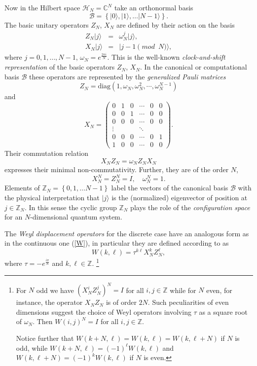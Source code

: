 \documentclass[10pt]{amsart}
\theoremstyle{plain}
\theoremstyle{definition}
\theoremstyle{remark}%
\newcommand{\Z}{\mathbb{Z}}
\newcommand{\ket}[1]{\vert\mathit{#1}\rangle}
\begin{document}
Now in the Hilbert space $\mathcal{H}_{N}=\mathbb{C}^N$ take
an orthonormal basis $$\mathcal{B} = \left\lbrace\ket{0}, \ket{1},
\ldots \ket{N-1}\right\rbrace.$$ The basic unitary operators $Z_N$,
$X_N$ are defined by their action on the basis \cite{Schwinger,Weyl}
\begin{eqnarray}
Z_N \ket{j}&=& \omega_N^j \ket{j}, \\
X_N \ket{j} &=& \ket{j-1 \pmod{N}},
\end{eqnarray}
where $j=0,1,\ldots,N-1$, $\omega_N = e^{\frac{2\pi i}{N}}$. 
This is the well-known \textit{clock-and-shift representation} of the basic
operators $Z_N$, $X_N$. In the canonical or computational basis
$\mathcal{B}$ these operators are represented by the
\textit{generalized Pauli matrices}
\begin{equation}
Z_N = \mbox{diag}\left(1,\omega_N,\omega_N^2,\cdots,\omega_N^{N-1}\right)
\end{equation}
and
\begin{equation}
X_N = \left(
\begin{array}{cccccc}
0 & 1 & 0& \cdots & 0 & 0 \\
0 & 0& 1&  \cdots & 0 & 0 \\
0 & 0 & 0&\cdots & 0 & 0 \\
\vdots &   & & \ddots &   & \\
0 & 0 &0 & \cdots & 0 & 1 \\
1 & 0 &0 &\cdots & 0 & 0
\end{array} \right) .
\end{equation}
Their commutation relation
\begin{equation}
X_N Z_N = \omega_N Z_N X_N 
\end{equation}
expresses their minimal non-commutativity. Further, they are of the order $N$,
$$
 X_N^N = Z_N^N = I, \quad \omega_N^N = 1.
$$
Elements of $\mathbb{Z}_N = \left\lbrace 0,1,\ldots N-1
\right\rbrace $ label the vectors of the canonical basis
$\mathcal{B}$ with the physical interpretation that $\ket{j}$ is the
(normalized) eigenvector of position at $j \in \mathbb{Z}_N$. In
this sense the cyclic group $\mathbb{Z}_N$ plays the role of the
\textit{configuration space} for an $N$-dimensional quantum system. 

The \emph{Weyl  displacement operators} for the discrete case have an analogous form as in the continuous one (\ref{W}), in particular they are defined according to \cite{appleby} as
$$W(k,\ell)=\tau^{k\ell}X_N^k Z_N^\ell,
$$ 
where $\tau=-e^{\frac{i\pi}{N}}$  and  $k,\ell\in \Z$. \footnote{For $N$ odd we have $(X_N^iZ_N^j)^N=I$ for all $i,j\in\Z$ while for $N$ even, for instance, the operator $X_N Z_N$ is of order $2N$.
Such peculiarities of even dimensions suggest the choice of Weyl operators involving $\tau$ as a square root of $\omega_N$. Then $W(i,j)^N=I$ for all $i,j\in\Z$.

Notice further that $W(k+N,\ell)=W(k,\ell)=W(k,\ell+N)$ if $N$ is odd, while $W(k+N,\ell)=(-1)^{\ell}W(k,\ell)$ and $W(k,\ell+N)=(-1)^kW(k,\ell)$ if $N$ is even.} 
\end{document}

